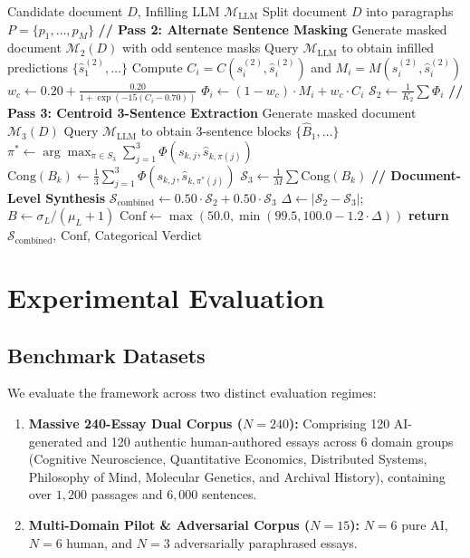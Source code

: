 \documentclass[conference]{IEEEtran}
\begin{document}
\begin{algorithm}[h]
\caption{Two-Pass Cloze Congruence Detection}
\label{alg:cloze}
\begin{algorithmic}[1]
\REQUIRE Candidate document $D$, Infilling LLM $\mathcal{M}_{\text{LLM}}$
\STATE Split document $D$ into paragraphs $P = \{p_1, \dots, p_M\}$
\STATE \textbf{// Pass 2: Alternate Sentence Masking}
\STATE Generate masked document $\mathcal{M}_2(D)$ with odd sentence masks
\STATE Query $\mathcal{M}_{\text{LLM}}$ to obtain infilled predictions $\{\hat{s}_1^{(2)}, \dots\}$
    \STATE Compute $C_i = C(s_i^{(2)}, \hat{s}_i^{(2)})$ and $M_i = M(s_i^{(2)}, \hat{s}_i^{(2)})$
    \STATE $w_c \leftarrow 0.20 + \frac{0.20}{1 + \exp(-15(C_i - 0.70))}$
    \STATE $\Phi_i \leftarrow (1 - w_c) \cdot M_i + w_c \cdot C_i$
\ENDFOR
\STATE $\mathcal{S}_2 \leftarrow \frac{1}{K_2}\sum \Phi_i$
\STATE \textbf{// Pass 3: Centroid 3-Sentence Extraction}
\STATE Generate masked document $\mathcal{M}_3(D)$
\STATE Query $\mathcal{M}_{\text{LLM}}$ to obtain 3-sentence blocks $\{\hat{B}_1, \dots\}$
    \STATE $\pi^* \leftarrow \arg\max_{\pi \in S_3} \sum_{j=1}^3 \Phi(s_{k,j}, \hat{s}_{k,\pi(j)})$
    \STATE $\text{Cong}(B_k) \leftarrow \frac{1}{3}\sum_{j=1}^3 \Phi(s_{k,j}, \hat{s}_{k,\pi^*(j)})$
\ENDFOR
\STATE $\mathcal{S}_3 \leftarrow \frac{1}{M}\sum \text{Cong}(B_k)$
\STATE \textbf{// Document-Level Synthesis}
\STATE $\mathcal{S}_{\text{combined}} \leftarrow 0.50 \cdot \mathcal{S}_2 + 0.50 \cdot \mathcal{S}_3$
\STATE $\Delta \leftarrow |\mathcal{S}_2 - \mathcal{S}_3|$; \quad $B \leftarrow \sigma_L / (\mu_L + 1)$
\STATE $\text{Conf} \leftarrow \max(50.0, \min(99.5, 100.0 - 1.2 \cdot \Delta))$
\STATE \textbf{return} $\mathcal{S}_{\text{combined}}$, $\text{Conf}$, Categorical Verdict
\end{algorithmic}
\end{algorithm}

\section{Experimental Evaluation}

\subsection{Benchmark Datasets}
We evaluate the framework across two distinct evaluation regimes:
\begin{enumerate}
    \item \textbf{Massive 240-Essay Dual Corpus ($N=240$):} Comprising 120 AI-generated and 120 authentic human-authored essays across 6 domain groups (Cognitive Neuroscience, Quantitative Economics, Distributed Systems, Philosophy of Mind, Molecular Genetics, and Archival History), containing over $1,200$ passages and $6,000$ sentences.
    \item \textbf{Multi-Domain Pilot & Adversarial Corpus ($N=15$):} $N=6$ pure AI, $N=6$ human, and $N=3$ adversarially paraphrased essays.
\end{enumerate}
\end{document}
